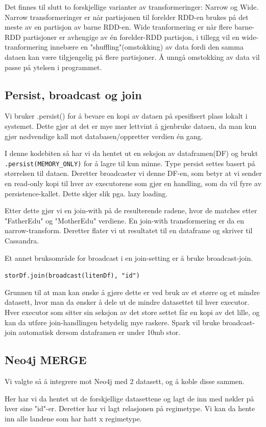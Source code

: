 Det finnes til slutt to forskjellige varianter av transformeringer: Narrow og Wide. Narrow transformeringer er når partisjonen til forelder RDD-en brukes på det meste av en partisjon av barne RDD-en. Wide tranformering er når flere barne-RDD partisjoner er avhengige av én forelder-RDD partisjon, i tillegg vil en wide-tranformering innebære en "shuffling"(omstokking) av data fordi den samma dataen kan være tilgjengelig på flere partisjoner. Å unngå omstokking av data vil passe på ytelsen i programmet.


\subsection{Persist, broadcast og join}
Vi bruker .persist() for å bevare en kopi av dataen på spesifisert plass lokalt i systemet. Dette gjør at det er mye mer lettvint å gjenbruke dataen, da man kun gjør nødvendige kall mot databasen/oppretter verdien én gang.




I denne kodebiten så har vi da hentet ut en seksjon av dataframen(DF) og brukt \lstinline{.persist(MEMORY_ONLY)} for å lagre til kun minne. Type persist settes basert på størrelsen til dataen. Deretter broadcaster vi denne DF-en, som betyr at vi sender en read-only kopi til hver av executorene som gjør en handling, som da vil fyre av persistence-kallet. Dette skjer slik pga. lazy loading.


Etter dette gjør vi en join-with på de resulterende radene, hvor de matches etter "FatherEdu" og "MotherEdu" verdiene. En join-with transformering er da en narrow-transform. Deretter flater vi ut resultatet til en dataframe og skriver til Cassandra.


Et annet bruksområde for broadcast i en join-setting er å bruke broadcast-join.


\lstinline {storDf.join(broadcast(litenDf), "id")}


Grunnen til at man kan ønske å gjøre dette er ved bruk av et større og et mindre datasett, hvor man da ønsker å dele ut de mindre datasettet til hver executor. Hver executor som sitter sin seksjon av det store settet får en kopi av det lille, og kan da utføre join-handlingen betydelig mye raskere. Spark vil bruke broadcast-join automatisk dersom dataframen er under 10mb stor.


\subsection{Neo4j MERGE}
Vi valgte så å integrere mot Neo4j med 2 datasett, og å koble disse sammen.



Her har vi da hentet ut de forskjellige datasettene og lagt de inn med nøkler på hver sine "id"-er. Deretter har vi lagt relasjonen på regimetype. Vi kan da hente inn alle landene som har hatt x regimetype.




